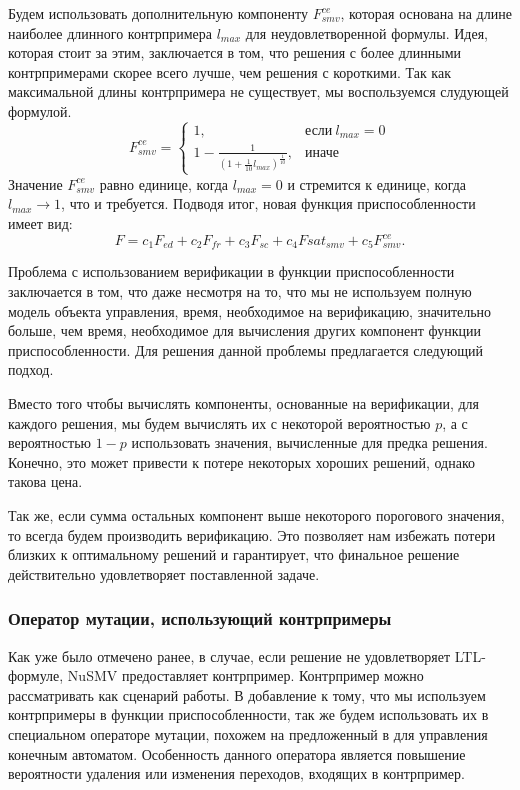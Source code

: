 \documentclass[14pt]{article}
\begin{document}
Будем использовать дополнительную компоненту $F^{ce}_{smv}$, которая
основана на длине наиболее длинного контрпримера $l_{max}$ для
неудовлетворенной формулы. Идея, которая стоит за этим, заключается в том, что
решения с более длинными контрпримерами скорее всего лучше, чем решения с
короткими. Так как максимальной длины контрпримера не существует, мы
воспользуемся слудующей формулой.
$$
F^{ce}_{smv} = \begin{cases} 1, & \mbox{если}\ l_{max} = 0 \\
1 - \frac{1}{(1 + \frac{1}{10}l_{max})^{\frac{1}{10}}}, & \mbox{иначе}
\end{cases}
$$
Значение $F^{ce}_{smv}$ равно единице, когда $l_{max} = 0$ и стремится к
единице, когда $l_{max} \rightarrow 1$, что и требуется. Подводя итог,
новая функция приспособленности имеет вид:
$$
F = c_1 F_{ed} + c_2 F_{fr} + c_3 F_{sc} + c_4 F{sat}_{smv} + c_5 F^{ce}_{smv}.
$$

Проблема с использованием верификации в функции приспособленности заключается
в том, что даже несмотря на то, что мы не используем полную модель объекта управления,
время, необходимое на верификацию, значительно больше, чем время, необходимое
для вычисления других компонент функции приспособленности. Для решения данной проблемы
предлагается следующий подход.

Вместо того чтобы вычислять компоненты, основанные на верификации, для каждого
решения, мы будем вычислять их с некоторой вероятностью $p$, а с вероятностью
$1 - p$ использовать значения, вычисленные для предка решения. Конечно, это
может привести к потере некоторых хороших решений, однако такова цена.

Так же, если сумма остальных компонент выше некоторого порогового значения, то всегда
будем производить верификацию. Это позволяет нам избежать потери близких к оптимальному
решений и гарантирует, что финальное решение действительно удовлетворяет
поставленной задаче.

\subsubsection{Оператор мутации, использующий контрпримеры}

Как уже было отмечено ранее, в случае, если решение не удовлетворяет LTL-формуле,
NuSMV предоставляет контрпример. Контрпример можно рассматривать как сценарий
работы. В добавление к тому, что мы используем контрпримеры в функции
приспособленности, так же будем использовать их в специальном операторе
мутации, похожем на предложенный в \cite{et} для управления конечным автоматом. Особенность данного оператора является повышение вероятности
удаления или изменения переходов, входящих в контрпример.
\end{document}
